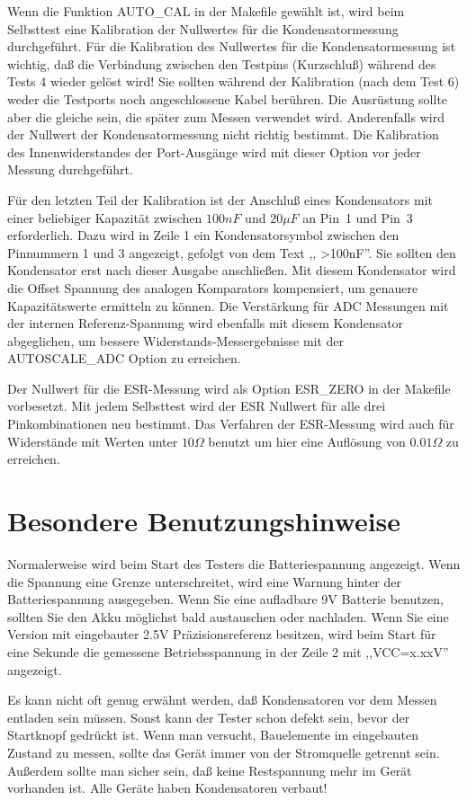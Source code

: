 Wenn die Funktion AUTO\_CAL in der Makefile gewählt ist, wird beim Selbsttest
eine Kalibration der Nullwertes für die Kondensatormessung durchgeführt.
Für die Kalibration des Nullwertes für die Kondensatormessung ist wichtig, 
daß die Verbindung zwischen den Testpins (Kurzschluß) während des Tests 4 wieder gelöst wird!
Sie sollten während der Kalibration (nach dem Test 6) weder die Testports noch angeschlossene Kabel berühren.
Die Ausrüstung sollte aber die gleiche sein, die später zum Messen verwendet wird.
Anderenfalls wird der Nullwert der Kondensatormessung nicht richtig bestimmt.
Die Kalibration des Innenwiderstandes der Port-Ausgänge wird mit dieser Option vor jeder
Messung durchgeführt.

Für den letzten Teil der Kalibration ist der Anschluß eines Kondensators 
mit einer beliebiger Kapazität zwischen \(100 nF\) und \(20 \mu F\) an Pin~1 und Pin~3 erforderlich.
Dazu wird in Zeile 1 ein Kondensatorsymbol zwischen den Pinnummern 1 und 3 angezeigt, gefolgt von dem Text ,, \textgreater100nF''.
Sie sollten den Kondensator erst nach dieser Ausgabe anschließen.
Mit diesem Kondensator wird die Offset Spannung des analogen Komparators kompensiert,
um genauere Kapazitätswerte ermitteln zu können.
Die Verstärkung für ADC Messungen mit der internen Referenz-Spannung wird ebenfalls mit diesem Kondensator abgeglichen, um
bessere Widerstands-Messergebnisse mit der AUTOSCALE\_ADC Option zu erreichen.

Der Nullwert für die ESR-Messung wird als Option ESR\_ZERO in der Makefile vorbesetzt.
Mit jedem Selbsttest wird der ESR Nullwert für alle drei Pinkombinationen neu bestimmt.
Das Verfahren der ESR-Messung wird auch für Widerstände mit Werten unter \(10 \Omega\) benutzt um
hier eine Auflösung von \(0.01 \Omega\) zu erreichen.

\section{Besondere Benutzungshinweise}
Normalerweise wird beim Start des Testers die Batteriespannung angezeigt. Wenn die Spannung eine Grenze unterschreitet, 
wird eine Warnung hinter der Batteriespannung ausgegeben. Wenn Sie eine aufladbare 9V Batterie benutzen, sollten Sie
den Akku möglichst bald austauschen oder nachladen.
Wenn Sie eine Version mit eingebauter 2.5V Präzisionsreferenz besitzen, wird beim Start für eine Sekunde die
gemessene Betriebsspannung in der Zeile 2 mit ,,VCC=x.xxV'' angezeigt.

Es kann nicht oft genug erwähnt werden, daß Kondensatoren vor dem Messen entladen sein müssen.
Sonst kann der Tester schon defekt sein, bevor der Startknopf gedrückt ist.
Wenn man versucht, Bauelemente im eingebauten Zustand zu messen, sollte das Gerät immer von
der Stromquelle getrennt sein. Außerdem sollte man sicher sein, daß keine Restspannung mehr
im Gerät vorhanden ist. Alle Geräte haben Kondensatoren verbaut!

